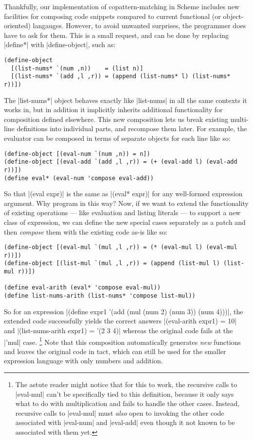 Thankfully, our implementation of copattern-matching in Scheme includes new facilities for composing code snippets compared to current functional (or object-oriented) langauges.
However, to avoid unwanted surprises, the programmer does have to ask for them.
This is a small request, and can be done by replacing \scm|define*| with \scm|define-object|, such as:
\begin{verbatim}
(define-object
  [(list-nums* `(num ,n))    = (list n)]
  [(list-nums* `(add ,l ,r)) = (append (list-nums* l) (list-nums* r))])
\end{verbatim}
The \scm|list-nums*| object behaves exactly like \scm|list-nums| in all the same contexts it works in, but in addition it implicitly inherits additional functionality for composition defined elsewhere.
This new composition lets us break existing multi-line definitions into individual parts, and recompose them later.
For example, the evaluator can be composed in terms of separate objects for each line like so:
\begin{verbatim}
(define-object [(eval-num `(num ,n)) = n])
(define-object [(eval-add `(add ,l ,r)) = (+ (eval-add l) (eval-add r))])
(define eval* (eval-num 'compose eval-add))
\end{verbatim}
So that \scm|(eval expr)| is the same as \scm|(eval* expr)| for any well-formed expression argument.
Why program in this way?
Now, if we want to extend the functionality of existing operations --- like evaluation and listing literals --- to support a new class of expression, we can define the new special cases separately as a patch and then \emph{compose} them with the existing code as-is like so:
\begin{verbatim}
(define-object [(eval-mul `(mul ,l ,r)) = (* (eval-mul l) (eval-mul r))])
(define-object [(list-mul `(mul ,l ,r)) = (append (list-mul l) (list-mul r))])

(define eval-arith (eval* 'compose eval-mul))
(define list-nums-arith (list-nums* 'compose list-mul))
\end{verbatim}
So for an expression \scm|(define expr1 '(add (mul (num 2) (num 3)) (num 4)))|, the extended code successfully yields the correct answers \scm|(eval-arith expr1) = 10| and \scm|(list-nums-arith expr1) = '(2 3 4)| whereas the original code fails at the \scm|'mul| case.%
\footnote{
  The astute reader might notice that for this to work, the recursive calls to \scm|eval-mul| can't be specifically tied to this definition, because it only says what to do with multiplication and fails to handle the other cases.
  Instead, recursive calls to \scm|eval-mul| must \emph{also} open to invoking the other code associated with \scm|eval-num| and \scm|eval-add| even though it not known to be associated with them yet.}
%
Note that this composition automatically generates \emph{new} functions and leaves the original code in tact, which can still be used for the smaller expression language with only numbers and addition.

